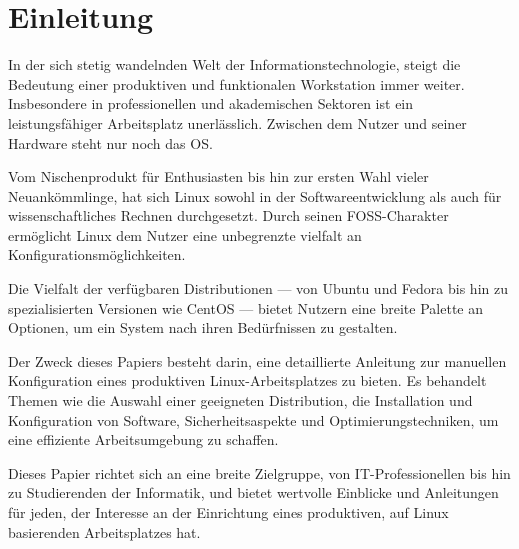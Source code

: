 \section{Einleitung}

In der sich stetig wandelnden Welt der Informationstechnologie, steigt die Bedeutung einer produktiven und funktionalen Workstation immer weiter. Insbesondere in professionellen und akademischen Sektoren ist ein leistungsfähiger Arbeitsplatz unerlässlich. Zwischen dem Nutzer und seiner Hardware steht nur noch das \Gls{OS}.

Vom Nischenprodukt für Enthusiasten bis hin zur ersten Wahl vieler Neuankömmlinge, hat sich Linux sowohl in der Softwareentwicklung als auch für wissenschaftliches Rechnen durchgesetzt. Durch seinen \gls{FOSS}-Charakter ermöglicht Linux dem Nutzer eine unbegrenzte vielfalt an Konfigurationsmöglichkeiten.

Die Vielfalt der verfügbaren Distributionen --- von Ubuntu und Fedora bis hin zu
spezialisierten Versionen wie CentOS --- bietet Nutzern eine breite Palette an
Optionen, um ein System nach ihren Bedürfnissen zu gestalten.

Der Zweck dieses Papiers besteht darin, eine detaillierte Anleitung zur
manuellen Konfiguration eines produktiven Linux-Arbeitsplatzes zu bieten. Es
behandelt Themen wie die Auswahl einer geeigneten Distribution, die Installation
und Konfiguration von Software, Sicherheitsaspekte und Optimierungstechniken, um
eine effiziente Arbeitsumgebung zu schaffen.

Dieses Papier richtet sich an eine breite Zielgruppe, von IT-Professionellen bis
hin zu Studierenden der Informatik, und bietet wertvolle Einblicke und
Anleitungen für jeden, der Interesse an der Einrichtung eines produktiven, auf
Linux basierenden Arbeitsplatzes hat.
